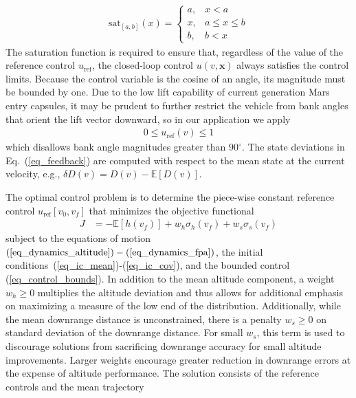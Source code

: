 \documentclass[journal ]{new-aiaa}
\newcommand{\state}{\ensuremath{\mathbf{x}}}
\newcommand{\ur}{\ensuremath{u_{\mathrm{ref}}}}
\newcommand{\E}[1]{\mathbb{E}\left[#1\right]}
\newcommand{\V}[1]{\mathbb{V}[#1]}
\begin{document}
\begin{align*}
\mathrm{sat}_{[a,b]}(x) = \left\{\begin{array}{lc}
        a, &  x < a\\
        x, &  a\le x \le b\\
        b, &  b < x
        \end{array} \right. %
\end{align*}
The saturation function is required to ensure that, regardless of the value of the reference control \ur, the closed-loop control $u(v,\state)$ always satisfies the control limits. Because the control variable is the cosine of an angle, its magnitude must be bounded by one. Due to the low lift capability of current generation Mars entry capsules, it may be prudent to further restrict the vehicle from bank angles that orient the lift vector downward, so in our application we apply
\begin{align}
	0 \le \ur(v) \le 1 \label{eq_control_bounds}
\end{align}
which disallows bank angle magnitudes greater than $90^\circ$.
The state deviations in Eq.~(\ref{eq_feedback}) are computed with respect to the mean state at the current velocity, e.g., $\delta D(v) = D(v) - \E{D(v)}$.

The optimal control problem is to determine the piece-wise constant reference control $\ur\left[v_0,v_f\right]$ that minimizes the objective functional
\begin{align}
J &= -\E{h(v_f)} + w_h\sigma_h(v_f) + w_s\sigma_s(v_f) \label{eq_objective}
\end{align}
subject to the equations of motion $(\ref{eq_dynamics_altitude})-(\ref{eq_dynamics_fpa})$, the initial conditions~(\ref{eq_ic_mean})-(\ref{eq_ic_cov}), and the bounded control (\ref{eq_control_bounds}). 
In addition to the mean altitude component, a weight $w_h\ge0$ multiplies the altitude deviation and thus allows for additional emphasis on maximizing a measure of the low end of the distribution. Additionally, while the mean downrange distance is unconstrained, there is a penalty $w_s\ge0$ on standard deviation of the downrange distance. For small $w_s$, this term is used to discourage solutions from sacrificing downrange accuracy for small altitude improvements. Larger weights encourage greater reduction in downrange errors at the expense of altitude performance. The solution consists of the reference controls and the mean trajectory
\end{document}
